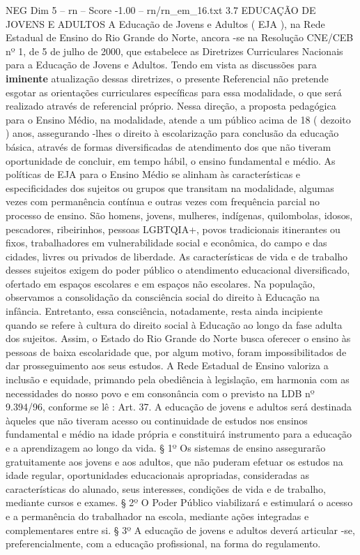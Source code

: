 \begin{textsample}{NEG Dim 5 – rn – Score -1.00 – rn/rn\_em\_16.txt}  \label{ex:f5_neg_149}
3.7 EDUCAÇÃO DE JOVENS E ADULTOS A Educação de Jovens e Adultos ( EJA ), na Rede Estadual de Ensino do Rio Grande do Norte, ancora -se na Resolução CNE/CEB nº 1, de 5 de julho de 2000, que estabelece as Diretrizes Curriculares Nacionais para a Educação de Jovens e Adultos.
Tendo em vista as discussões para \textbf{iminente} atualização dessas diretrizes, o presente Referencial não pretende esgotar as orientações curriculares específicas para essa modalidade, o que será realizado através de referencial próprio.
Nessa direção, a proposta pedagógica para o Ensino Médio, na modalidade, atende a um público acima de 18 ( dezoito ) anos, assegurando -lhes o direito à escolarização para conclusão da educação básica, através de formas diversificadas de atendimento dos que não tiveram oportunidade de concluir, em tempo hábil, o ensino fundamental e médio.
As políticas de EJA para o Ensino Médio se alinham às características e especificidades dos sujeitos ou grupos que transitam na modalidade, algumas vezes com permanência contínua e outras vezes com frequência parcial no processo de ensino.
São homens, jovens, mulheres, indígenas, quilombolas, idosos, pescadores, ribeirinhos, pessoas LGBTQIA+, povos tradicionais itinerantes ou fixos, trabalhadores em vulnerabilidade social e econômica, do campo e das cidades, livres ou privados de liberdade.
As características de vida e de trabalho desses sujeitos exigem do poder público o atendimento educacional diversificado, ofertado em espaços escolares e em espaços não escolares.
Na população, observamos a consolidação da consciência social do direito à Educação na infância.
Entretanto, essa consciência, notadamente, resta ainda incipiente quando se refere à cultura do direito social à Educação ao longo da fase adulta dos sujeitos.
Assim, o Estado do Rio Grande do Norte busca oferecer o ensino às pessoas de baixa escolaridade que, por algum motivo, foram impossibilitados de dar prosseguimento aos seus estudos.
A Rede Estadual de Ensino valoriza a inclusão e equidade, primando pela obediência à legislação, em harmonia com as necessidades do nosso povo e em consonância com o previsto na LDB nº 9.394/96, conforme se lê : Art. 37.
A educação de jovens e adultos será destinada àqueles que não tiveram acesso ou continuidade de estudos nos ensinos fundamental e médio na idade própria e constituirá instrumento para a educação e a aprendizagem ao longo da vida. § 1º Os sistemas de ensino assegurarão gratuitamente aos jovens e aos adultos, que não puderam efetuar os estudos na idade regular, oportunidades educacionais apropriadas, consideradas as características do alunado, seus interesses, condições de vida e de trabalho, mediante cursos e exames. § 2º O Poder Público viabilizará e estimulará o acesso e a permanência do trabalhador na escola, mediante ações integradas e complementares entre si. § 3º A educação de jovens e adultos deverá articular -se, preferencialmente, com a educação profissional, na forma do regulamento.

\end{textsample}
